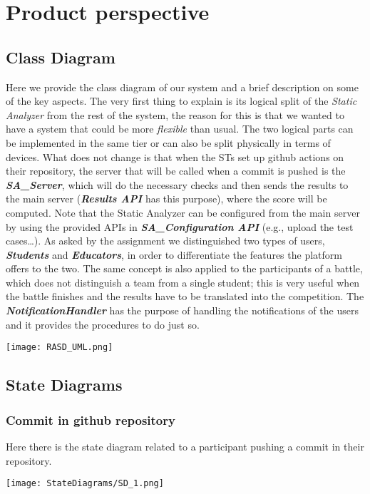 \section{Product perspective}
\label{s:Product_perspective}%

\subsection{Class Diagram}
\label{ss:class_diagram}%
Here we provide the class diagram of our system and a brief description on some of the key aspects. The very first thing to explain is its logical split of the \textit{Static Analyzer} from the rest of the system, the reason for this is that we wanted to have a system that could be more \textit{flexible} than usual. The two logical parts can be implemented in the same tier or can also be split physically in terms of devices. What does not change is that when the STs set up github actions on their repository, the server that will be called when a commit is pushed is the \textbf{\textit{SA\_Server}}, which will do the necessary checks and then sends the results to the main server (\textbf{\textit{Results API}} has this purpose), where the score will be computed. Note that the Static Analyzer can be configured from the main server by using the provided APIs in \textbf{\textit{SA\_Configuration API}} (e.g., upload the test cases…). 
As asked by the assignment we distinguished two types of users, \textbf{\textit{Students}} and \textbf{\textit{Educators}}, in order to differentiate the features the platform offers to the two. The same concept is also applied to the participants of a battle, which does not distinguish a team from a single student; this is very useful when the battle finishes and the results have to be translated into the competition. The \textbf{\textit{NotificationHandler}} has the purpose of handling the notifications of the users and it provides the procedures to do just so.


\begin{center}
  \texttt{[image: RASD\_UML.png]}
\end{center}

\subsection{State Diagrams}
\label{ss:state_diagrams}%

\subsubsection*{Commit in github repository}
Here there is the state diagram related to a participant pushing a commit in their repository.
  \begin{center}
    \texttt{[image: StateDiagrams/SD\_1.png]}
  \end{center}
\newpage 
